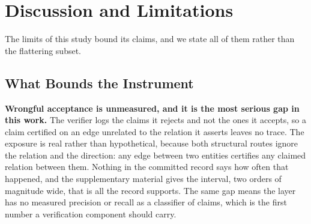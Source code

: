 %
%
%

\section{Discussion and Limitations}\label{sec:discussion}

The limits of this study bound its claims, and we state all of them
rather than the flattering subset.

\subsection{What Bounds the Instrument}\label{sec:limits-contribution}

\textbf{Wrongful acceptance is unmeasured, and it is the most serious
gap in this work.} The verifier logs the claims it rejects and not the
ones it accepts, so a claim certified on an edge unrelated to the
relation it asserts leaves no trace. The exposure is real rather than
hypothetical, because both structural routes ignore the relation and the
direction: any edge between two entities certifies any claimed relation
between them. Nothing in the committed record says how often that
happened, and the supplementary material gives the interval, two orders
of magnitude wide, that is all the record supports. The same gap means
the layer has no measured precision or recall as a classifier of claims,
which is the first number a verification component should carry.

